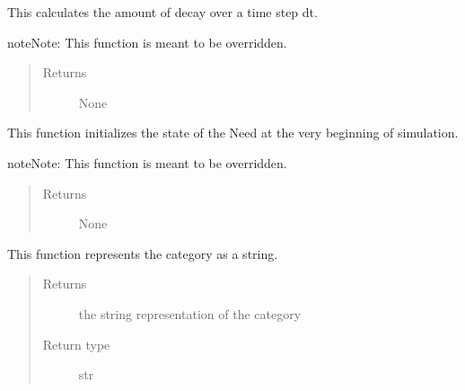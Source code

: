 \documentclass[letterpaper,10pt,english]{sphinxmanual}
\begin{document}
\begin{fulllineitems}
\begin{fulllineitems}
\label{need:need.Need.decay}
This calculates the amount of decay over a time step dt.

\begin{notice}{note}{Note:}
This function is meant to be overridden.
\end{notice}
\begin{quote}\begin{description}
\item[{Returns}] \leavevmode
None

\end{description}\end{quote}

\end{fulllineitems}


\begin{fulllineitems}
\label{need:need.Need.initialize}
This function initializes the state of the Need at the very beginning of simulation.

\begin{notice}{note}{Note:}
This function is meant to be overridden.
\end{notice}
\begin{quote}\begin{description}
\item[{Returns}] \leavevmode
None

\end{description}\end{quote}

\end{fulllineitems}


\begin{fulllineitems}
\label{need:need.Need.print_category}
This function represents the category as a string.
\begin{quote}\begin{description}
\item[{Returns}] \leavevmode
the string representation of the category

\item[{Return type}] \leavevmode
str

\end{description}\end{quote}


\end{fulllineitems}
\end{fulllineitems}
\end{document}
